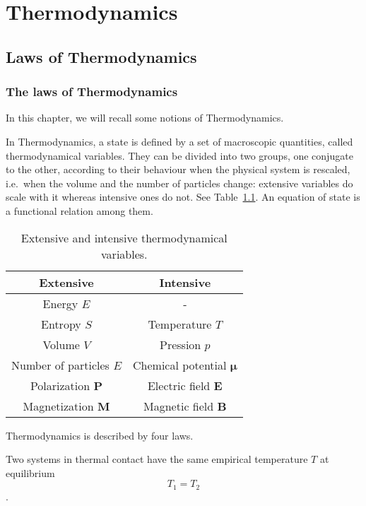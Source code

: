 \part{Thermodynamics}

\chapter{Laws of Thermodynamics}

\section{The laws of Thermodynamics}

    In this chapter, we will recall some notions of Thermodynamics.

    In Thermodynamics, a state is defined by a set of macroscopic quantities, called thermodynamical variables. They can be divided into two groups, one conjugate to the other, according to their behaviour when the physical system is rescaled, i.e.~when the volume and the number of particles change: extensive variables do scale with it whereas intensive ones do not. See Table~\ref{table:1}. An equation of state is a functional relation among them.

    \begin{table}[h!]
        \centering
        \begin{tabular}{c | c }
            Extensive & Intensive \\
            \hline
            Energy $E$ & - \\ 
            Entropy $S$ & Temperature $T$ \\ 
            Volume $V$ & Pression $p$\\ 
            Number of particles $E$ & Chemical potential $\mathbf \mu$ \\ 
            Polarization $\mathbf P$ & Electric field $\mathbf E$ \\ 
            Magnetization $\mathbf M$ & Magnetic field $\mathbf B$ \\ 
        \end{tabular}
        \caption{Extensive and intensive thermodynamical variables.}
        \label{table:1}
    \end{table}

    Thermodynamics is described by four laws.

    \begin{law}[0th]
        Two systems in thermal contact have the same empirical temperature $T$ at equilibrium
        \begin{equation*}
            T_1 = T_2
        \end{equation*}.
    \end{law}

